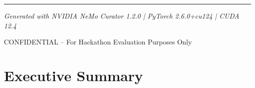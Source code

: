 \documentclass[11pt,a4paper]{article}
\begin{document}
\begin{titlepage}
    \vspace{2cm}
    
    {\color{nvidiaGreen}\rule{0.6\linewidth}{2pt}\par}
    \vspace{0.5cm}
    {\color{nvidiaBlue}\textit{Generated with NVIDIA NeMo Curator 1.2.0 | PyTorch 2.6.0+cu124 | CUDA 12.4}}
    
    \vfill
    
    {\color{nvidiaLightGray}\small CONFIDENTIAL -- For Hackathon Evaluation Purposes Only}
\end{titlepage}

\newpage
\tableofcontents
\newpage

\section{Executive Summary}
\label{sec:executive}
\end{document}
